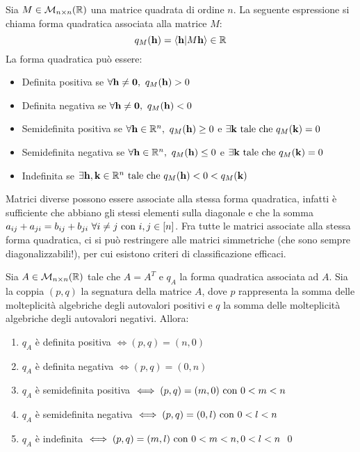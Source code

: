 Sia $M \in \mathcal{M}_{n \times n}(\mathbb{R})$ una matrice quadrata di ordine $n$. La seguente espressione si chiama forma quadratica associata alla matrice $M$:
$$
    q_M(\vb{h}) = \innerproduct{\vb{h}}{M\vb{h}} \in \R
$$
La forma quadratica può essere:
\begin{itemize}
    \item Definita positiva se $\forall \vb{h}\neq \vb{0}, \ q_M(\vb{h})> 0$
    \item Definita negativa se $\forall \vb{h}\neq \vb{0}, \ q_M(\vb{h}) < 0$
    \item Semidefinita positiva se $\forall \vb{h}\in \mathbb{R}^n, \ q_M(\vb{h}) \geq 0$ e $\exists \vb{k} \text{ tale che } q_M(\vb{k})=0$
    \item Semidefinita negativa se $\forall \vb{h}\in \mathbb{R}^n, \ q_M(\vb{h}) \leq 0$ e $\exists \vb{k} \text{ tale che } q_M(\vb{k})=0$
    \item Indefinita se $\exists \vb{h}, \vb{k} \in \mathbb{R}^n \text{ tale che } q_M(\vb{h}) < 0 < q_M(\vb{k})$
\end{itemize}

Matrici diverse possono essere associate alla stessa forma quadratica, infatti è sufficiente che abbiano gli stessi elementi sulla diagonale e che la somma $a_{ij}+a_{ji}=b_{ij}+b_{ji} \ \forall i\neq j\text{ con } i,j \in [n]$. Fra tutte le matrici associate alla stessa forma quadratica, ci si può restringere alle matrici simmetriche (che sono sempre diagonalizzabili!), per cui esistono criteri di classificazione efficaci.

\begin{theorem}
    Sia $A \in \mathcal{M}_{n\times n}(\mathbb{R})$ tale che $A=A^T$ e $q_A$ la forma quadratica associata ad $A$. Sia la coppia $(p,q)$ la segnatura della matrice $A$, dove $p$ rappresenta la somma delle molteplicità algebriche degli autovalori positivi e $q$ la somma delle molteplicità algebriche degli autovalori negativi. Allora:
    \begin{enumerate}
        \item $q_A$ è definita positiva $\iff (p,q)=(n,0)$
        \item $q_A$ è definita negativa $\iff (p,q)=(0,n)$
        \item $q_A$ è semidefinita positiva $\iff (p,q)=(m,0) \text{ con } 0< m < n$
        \item $q_A$ è semidefinita negativa $\iff (p,q)=(0,l) \text{ con } 0< l < n$
        \item $q_A$ è indefinita $\iff (p,q)=(m,l) \text{ con } 0<m<n,0<l<n$
        \qed
    \end{enumerate}
\end{theorem}

